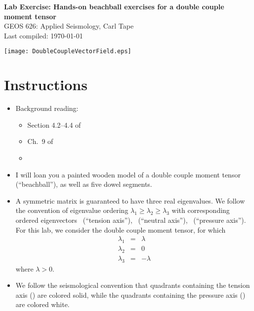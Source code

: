 \documentclass[11pt,titlepage,fleqn]{article}
\begin{document}

\begin{spacing}{1.2}
\centering
{\large \bf Lab Exercise: Hands-on beachball exercises for a double couple moment tensor} \\
GEOS 626: Applied Seismology, Carl Tape \\
Last compiled: \today \\
\end{spacing}


\vspace{-4.4cm}
\begin{center}
\texttt{[image: DoubleCoupleVectorField.eps]}
\end{center}


\vspace{-1.8cm}
\section*{Instructions}

\begin{itemize}
\item Background reading:
%
\begin{itemize}
\item Section 4.2--4.4 of \citet{SteinWysession}
\item Ch.~9 of \citet{ShearerE2}
\item \citet{TapeTape2012beach}
\end{itemize}

\item I will loan you a painted wooden model of a double couple moment tensor (``beachball''), as well as five dowel segments.

\item A symmetric matrix is guaranteed to have three real eigenvalues. We follow the convention of eigenvalue ordering $\lambda_1 \ge \lambda_2 \ge \lambda_3$ with corresponding ordered eigenvectors \mbT\ (``tension axis''), \mbB\ (``neutral axis''), \mbP\ (``pressure axis''). For this lab, we consider the double couple moment tensor, for which
%
\begin{eqnarray*}
\lambda_1 &=& \lambda
\\
\lambda_2 &=& 0
\\
\lambda_3 &=& -\lambda
\end{eqnarray*}
%
where $\lambda > 0$.

\item We follow the seismological convention that quadrants containing the tension axis (\mbT) are colored solid, while the quadrants containing the pressure axis (\mbP) are colored white.
\end{itemize}
\end{document}

